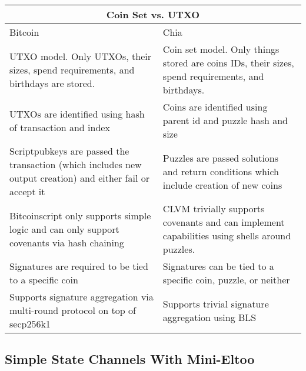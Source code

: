 \documentclass[a4paper]{article}
\begin{document}
\begin{multicols}{2}
\begin{tabular}{ |p{10em}|p{10em}|  }
 \hline
 \multicolumn{2}{|c|}{Coin Set vs. UTXO} \\
 \hline
 Bitcoin & Chia\\
 \hline\hline
 UTXO model. Only UTXOs, their sizes, spend requirements, and birthdays are stored. & Coin set model. Only things stored are coins IDs, their sizes, spend requirements, and birthdays.\\
 \hline
 UTXOs are identified using hash of transaction and index & Coins are identified using parent id and puzzle hash and size\\
 \hline
 Scriptpubkeys are passed the transaction (which includes new output creation) and either fail or accept it & Puzzles are passed solutions and return conditions which include creation of new coins\\
 \hline
 Bitcoinscript only supports simple logic and can only support covenants via hash chaining & CLVM trivially supports covenants and can implement capabilities using shells around puzzles.\\
 Signatures are required to be tied to a specific coin & Signatures can be tied to a specific coin, puzzle, or neither\\
 \hline
 Supports signature aggregation via multi-round protocol on top of secp256k1 & Supports trivial signature aggregation using BLS\\
 \hline
\end{tabular}

\subsection{Simple State Channels With Mini-Eltoo}


\end{multicols}
\end{document}
